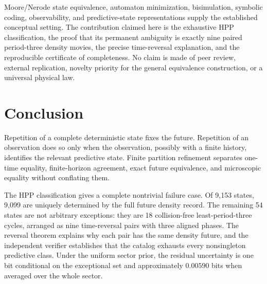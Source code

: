 \documentclass[11pt]{article}
\begin{document}
Moore/Nerode state equivalence, automaton minimization, bisimulation, symbolic
coding, observability, and predictive-state representations supply the established
conceptual setting. The contribution claimed here is the exhaustive HPP
classification, the proof that its permanent ambiguity is exactly nine paired
period-three density movies, the precise time-reversal explanation, and the
reproducible certificate of completeness. No claim is made of peer review,
external replication, novelty priority for the general equivalence construction,
or a universal physical law.

\section{Conclusion}

Repetition of a complete deterministic state fixes the future. Repetition of an
observation does so only when the observation, possibly with a finite history,
identifies the relevant predictive state. Finite partition refinement separates
one-time equality, finite-horizon agreement, exact future equivalence, and
microscopic equality without conflating them.

The HPP classification gives a complete nontrivial failure case. Of 9,153 states,
9,099 are uniquely determined by the full future density record. The remaining 54
states are not arbitrary exceptions: they are 18 collision-free least-period-three
cycles, arranged as nine time-reversal pairs with three aligned phases. The
reversal theorem explains why each pair has the same density future, and the
independent verifier establishes that the catalog exhausts every nonsingleton
predictive class. Under the uniform sector prior, the residual uncertainty is one
bit conditional on the exceptional set and approximately $0.00590$ bits when
averaged over the whole sector.
\end{document}
